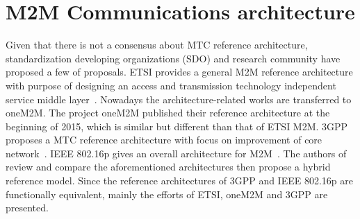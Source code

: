 \section{M2M Communications architecture}
\label{sec:overveiw-ref-m2m-arch}
Given that there is not a consensus about MTC reference architecture, standardization developing organizations (SDO) and research community have proposed a few of proposals. ETSI provides a general M2M reference architecture with purpose of designing an access and transmission technology independent service middle layer~\cite{ETSI/TS/102/690}. Nowadays the architecture-related works are transferred to oneM2M. The project oneM2M published their reference architecture at the beginning of 2015, which is similar but different than that of ETSI M2M. 3GPP proposes a MTC reference architecture with focus on improvement of core network~\cite{3GPP/TR/23888V11}. 
IEEE 802.16p gives an overall architecture for M2M~\cite{IEEE-requirement-doc}. 
The authors of~\cite{Loa2013} review and compare the aforementioned architectures then propose a hybrid reference model. Since the reference architectures of 3GPP and IEEE 802.16p are functionally equivalent, mainly the efforts of ETSI, oneM2M and 3GPP are presented. 
